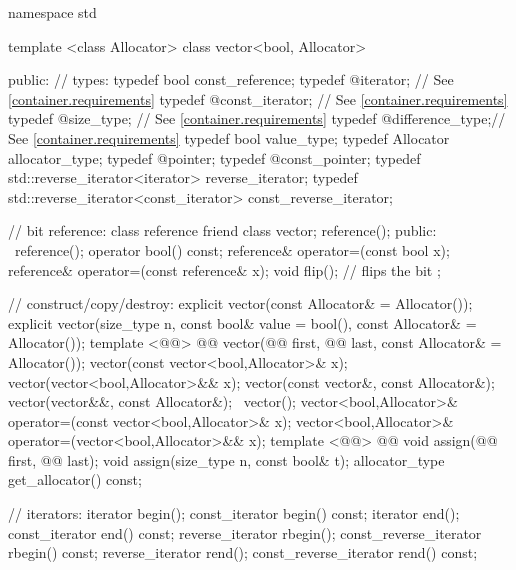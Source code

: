 \documentclass[american,twoside]{book}
\begin{document}
\begin{codeblock}
namespace std {
  template <class Allocator> class vector<bool, Allocator> {
  public:
    // types:
    typedef bool                                  const_reference;
    typedef @\impdef@                iterator;       // See \ref{container.requirements}
    typedef @\impdef@                const_iterator; // See \ref{container.requirements}
    typedef @\impdef@                size_type;      // See \ref{container.requirements}
    typedef @\impdef@                difference_type;// See \ref{container.requirements}
    typedef bool                                  value_type;
    typedef Allocator                             allocator_type;
    typedef @\impdef@                pointer;
    typedef @\impdef@                const_pointer;
    typedef std::reverse_iterator<iterator>       reverse_iterator;
    typedef std::reverse_iterator<const_iterator> const_reverse_iterator;

    // bit reference:
    class reference {
      friend class vector;
      reference();
    public:
      ~reference();
      operator bool() const;
      reference& operator=(const bool x);
      reference& operator=(const reference& x);
      void flip();              // flips the bit
    };

    // construct/copy/destroy:
    explicit vector(const Allocator& = Allocator());
    explicit vector(size_type n, const bool& value = bool(),
                    const Allocator& = Allocator());
    template <@@>
      @@
      vector(@@ first, @@ last,
             const Allocator& = Allocator());
    vector(const vector<bool,Allocator>& x);
    vector(vector<bool,Allocator>&& x);
    vector(const vector&, const Allocator&);
    vector(vector&&, const Allocator&);
   ~vector();
    vector<bool,Allocator>& operator=(const vector<bool,Allocator>& x);
    vector<bool,Allocator>& operator=(vector<bool,Allocator>&& x);
    template <@@>
      @@
      void assign(@@ first, @@ last);
    void assign(size_type n, const bool& t);
    allocator_type get_allocator() const;

    // iterators:
    iterator               begin();
    const_iterator         begin() const;
    iterator               end();
    const_iterator         end() const;
    reverse_iterator       rbegin();
    const_reverse_iterator rbegin() const;
    reverse_iterator       rend();
    const_reverse_iterator rend() const;

}}
\end{codeblock}
\end{document}
